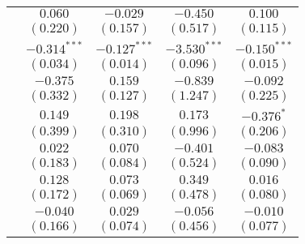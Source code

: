\begin{table}
\begin{center}
\begin{tabular}{l c c c c}
                                                 & $0.060$                      & $-0.029$       & $-0.450$                      & $0.100$        \\
                                                 & $(0.220)$                    & $(0.157)$      & $(0.517)$                     & $(0.115)$      \\
                                                 & $-0.314^{***}$               & $-0.127^{***}$ & $-3.530^{***}$                & $-0.150^{***}$ \\
                                                 & $(0.034)$                    & $(0.014)$      & $(0.096)$                     & $(0.015)$      \\
                                                 & $-0.375$                     & $0.159$        & $-0.839$                      & $-0.092$       \\
                                                 & $(0.332)$                    & $(0.127)$      & $(1.247)$                     & $(0.225)$      \\
                                                 & $0.149$                      & $0.198$        & $0.173$                       & $-0.376^{*}$   \\
                                                 & $(0.399)$                    & $(0.310)$      & $(0.996)$                     & $(0.206)$      \\
                                                 & $0.022$                      & $0.070$        & $-0.401$                      & $-0.083$       \\
                                                 & $(0.183)$                    & $(0.084)$      & $(0.524)$                     & $(0.090)$      \\
                                                 & $0.128$                      & $0.073$        & $0.349$                       & $0.016$        \\
                                                 & $(0.172)$                    & $(0.069)$      & $(0.478)$                     & $(0.080)$      \\
                                                 & $-0.040$                     & $0.029$        & $-0.056$                      & $-0.010$       \\
                                                 & $(0.166)$                    & $(0.074)$      & $(0.456)$                     & $(0.077)$      \\

\end{tabular}
\end{center}
\end{table}
